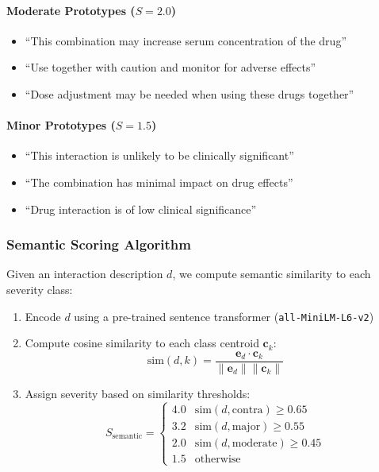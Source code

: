 \documentclass[11pt,a4paper]{article}
\begin{document}
\paragraph{Moderate Prototypes ($S = 2.0$)}
\begin{itemize}
    \item ``This combination may increase serum concentration of the drug''
    \item ``Use together with caution and monitor for adverse effects''
    \item ``Dose adjustment may be needed when using these drugs together''
\end{itemize}

\paragraph{Minor Prototypes ($S = 1.5$)}
\begin{itemize}
    \item ``This interaction is unlikely to be clinically significant''
    \item ``The combination has minimal impact on drug effects''
    \item ``Drug interaction is of low clinical significance''
\end{itemize}

\subsubsection{Semantic Scoring Algorithm}

Given an interaction description $d$, we compute semantic similarity to each severity class:

\begin{enumerate}
    \item Encode $d$ using a pre-trained sentence transformer (\texttt{all-MiniLM-L6-v2})
    \item Compute cosine similarity to each class centroid $\mathbf{c}_k$:
    \begin{equation}
    \text{sim}(d, k) = \frac{\mathbf{e}_d \cdot \mathbf{c}_k}{\|\mathbf{e}_d\| \|\mathbf{c}_k\|}
    \end{equation}
    \item Assign severity based on similarity thresholds:
    \begin{equation}
    S_{\text{semantic}} = 
    \begin{cases}
    4.0 & \text{sim}(d, \text{contra}) \geq 0.65 \\
    3.2 & \text{sim}(d, \text{major}) \geq 0.55 \\
    2.0 & \text{sim}(d, \text{moderate}) \geq 0.45 \\
    1.5 & \text{otherwise}
    \end{cases}
    \end{equation}
\end{enumerate}
\end{document}
